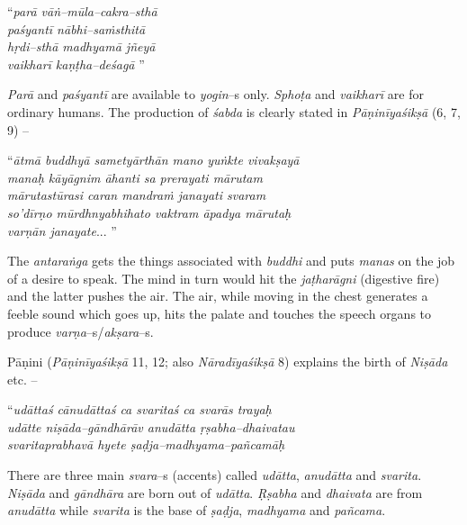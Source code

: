 \begin{myquote}
“\textit{parā vāṅ–mūla–cakra–sthā}\\\textit{paśyantī nābhi–saṁsthitā }\\\textit{hṛdi–sthā madhyamā jñeyā}\\\textit{vaikharī kaṇṭha–deśagā} ” 
\end{myquote}

\textit{Parā} and \textit{paśyantī} are available to \textit{yogin}–s only. \textit{Sphoṭa} and \textit{vaikharī} are for ordinary humans. The production of \textit{śabda} is clearly stated in \textit{Pāṇinīyaśikṣā} (6, 7, 9) –

\begin{myquote}
“\textit{ātmā buddhyā sametyārthān mano yuṅkte vivakṣayā }\\\textit{manaḥ kāyāgnim āhanti sa prerayati mārutam }\\\textit{mārutastūrasi caran mandraṁ janayati svaram }\\\textit{so’dīrṇo mūrdhnyabhihato vaktram āpadya mārutaḥ }\\\textit{varṇān janayate}... ”
\end{myquote}

The \textit{antaraṅga} gets the things associated with \textit{buddhi} and puts \textit{manas} on the job of a desire to speak. The mind in turn would hit the \textit{jaṭharāgni} (digestive fire) and the latter pushes the air. The air, while moving in the chest generates a feeble sound which goes up, hits the palate and touches the speech organs to produce \textit{varṇa}–s/\textit{akṣara}–s.

Pāṇini (\textit{Pāṇinīyaśikṣā} 11, 12; also \textit{Nāradīyaśikṣā} 8) explains the birth of \textit{Niṣāda} etc. –

\begin{myquote}
“\textit{udāttaś cānudāttaś ca svaritaś ca svarās trayaḥ }\\\textit{udātte niṣāda–gāndhārāv anudātta ṛṣabha–dhaivatau }\\\textit{svaritaprabhavā hyete ṣaḍja–madhyama–pañcamāḥ} 
\end{myquote}

There are three main \textit{svara}–s (accents) called \textit{udātta}, \textit{anudātta} and \textit{svarita}. \textit{Niṣāda} and \textit{gāndhāra} are born out of \textit{udātta}. \textit{Ṛṣabha} and \textit{dhaivata} are from \textit{anudātta} while \textit{svarita} is the base of \textit{ṣaḍja}, \textit{madhyama} and \textit{pañcama}.

